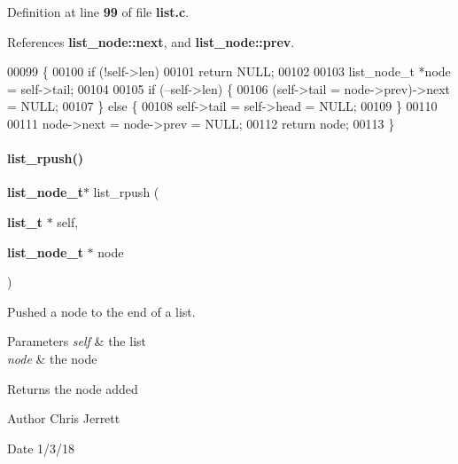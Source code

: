 Definition at line \textbf{ 99} of file \textbf{ list.\+c}.



References \textbf{ list\+\_\+node\+::next}, and \textbf{ list\+\_\+node\+::prev}.


\begin{DoxyCode}
00099                                      \{
00100   \textcolor{keywordflow}{if} (!self->len)
00101     \textcolor{keywordflow}{return} NULL;
00102 
00103   list_node_t *node = \textcolor{keyword}{self}->tail;
00104 
00105   \textcolor{keywordflow}{if} (--self->len) \{
00106     (\textcolor{keyword}{self}->tail = node->prev)->next = NULL;
00107   \} \textcolor{keywordflow}{else} \{
00108     \textcolor{keyword}{self}->tail = \textcolor{keyword}{self}->head = NULL;
00109   \}
00110 
00111   node->next = node->prev = NULL;
00112   \textcolor{keywordflow}{return} node;
00113 \}
\end{DoxyCode}
\mbox{\label{list_8c_a4edfa9b7742154bff4fc2cb05d044af9}} 
\paragraph{list\+\_\+rpush()}
{\footnotesize\ttfamily \textbf{ list\+\_\+node\+\_\+t}$\ast$ list\+\_\+rpush (\begin{DoxyParamCaption}\item[{\textbf{ list\+\_\+t} $\ast$}]{self,  }\item[{\textbf{ list\+\_\+node\+\_\+t} $\ast$}]{node }\end{DoxyParamCaption})}



Pushed a node to the end of a list. 


\begin{DoxyParams}{Parameters}
{\em self} & the list \\
\hline
{\em node} & the node \\
\hline
\end{DoxyParams}
\begin{DoxyReturn}{Returns}
the node added 
\end{DoxyReturn}
\begin{DoxyAuthor}{Author}
Chris Jerrett 
\end{DoxyAuthor}
\begin{DoxyDate}{Date}
1/3/18 
\end{DoxyDate}


